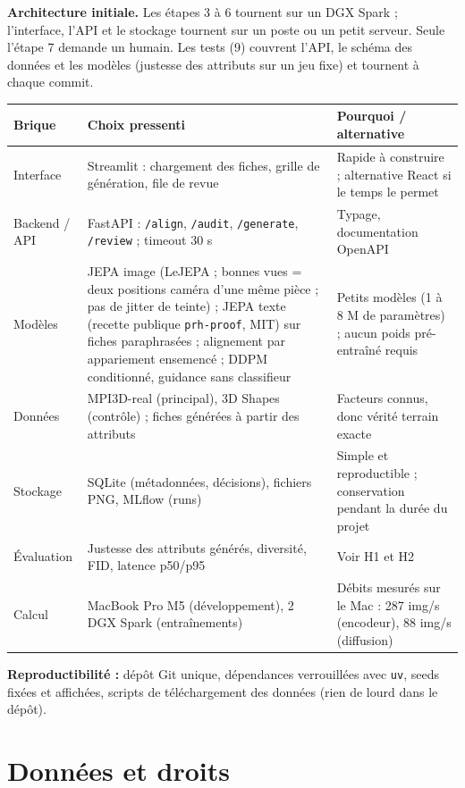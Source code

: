 \documentclass[10pt,a4paper]{article}
\begin{document}
\vspace{-4pt}
{\small \textbf{Architecture initiale.} Les étapes 3 à 6 tournent sur un DGX Spark ; l'interface, l'API et le stockage tournent sur un poste ou un petit serveur. Seule l'étape 7 demande un humain. Les tests (9) couvrent l'API, le schéma des données et les modèles (justesse des attributs sur un jeu fixe) et tournent à chaque commit.}

\begin{center}\small
\begin{tabularx}{\textwidth}{@{}P{2.4cm}P{4.6cm}L@{}}
\toprule
Brique & Choix pressenti & Pourquoi / alternative \\
\midrule
Interface & Streamlit : chargement des fiches, grille de génération, file de revue & Rapide à construire ; alternative React si le temps le permet \\
Backend / API & FastAPI : \texttt{/align}, \texttt{/audit}, \texttt{/generate}, \texttt{/review} ; timeout 30 s & Typage, documentation OpenAPI \\
Modèles & JEPA image (LeJEPA ; bonnes vues = deux positions caméra d'une même pièce ; pas de jitter de teinte) ; JEPA texte (recette publique \texttt{prh-proof}, MIT) sur fiches paraphrasées ; alignement par appariement ensemencé ; DDPM conditionné, guidance sans classifieur & Petits modèles (1 à 8 M de paramètres) ; aucun poids pré-entraîné requis \\
Données & MPI3D-real (principal), 3D Shapes (contrôle) ; fiches générées à partir des attributs & Facteurs connus, donc vérité terrain exacte \\
Stockage & SQLite (métadonnées, décisions), fichiers PNG, MLflow (runs) & Simple et reproductible ; conservation pendant la durée du projet \\
Évaluation & Justesse des attributs générés, diversité, FID, latence p50/p95 & Voir H1 et H2 \\
Calcul & MacBook Pro M5 (développement), 2 DGX Spark (entraînements) & Débits mesurés sur le Mac : 287 img/s (encodeur), 88 img/s (diffusion) \\
\bottomrule
\end{tabularx}
\end{center}
\textbf{Reproductibilité :} dépôt Git unique, dépendances verrouillées avec \texttt{uv}, seeds fixées et affichées, scripts de téléchargement des données (rien de lourd dans le dépôt).

\section{Données et droits}
\end{document}
